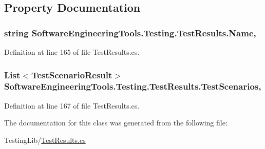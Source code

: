 \subsection{Property Documentation}
\hypertarget{class_software_engineering_tools_1_1_testing_1_1_test_results_af99977749c177523bcc298652bdde8c2}{
\subsubsection[{Name}]{\setlength{\rightskip}{0pt plus 5cm}string Software\+Engineering\+Tools.\+Testing.\+Test\+Results.\+Name\hspace{0.3cm}{\ttfamily [get]}, {\ttfamily [set]}}}\label{class_software_engineering_tools_1_1_testing_1_1_test_results_af99977749c177523bcc298652bdde8c2}


Definition at line 165 of file Test\+Results.\+cs.

\hypertarget{class_software_engineering_tools_1_1_testing_1_1_test_results_ac90e7e412834351717bad9a9ccb39366}{
\subsubsection[{Test\+Scenarios}]{\setlength{\rightskip}{0pt plus 5cm}List$<${\bf Test\+Scenario\+Result}$>$ Software\+Engineering\+Tools.\+Testing.\+Test\+Results.\+Test\+Scenarios\hspace{0.3cm}{\ttfamily [get]}, {\ttfamily [set]}}}\label{class_software_engineering_tools_1_1_testing_1_1_test_results_ac90e7e412834351717bad9a9ccb39366}


Definition at line 167 of file Test\+Results.\+cs.



The documentation for this class was generated from the following file\+:\begin{DoxyCompactItemize}
\item 
Testing\+Lib/\hyperlink{_test_results_8cs}{Test\+Results.\+cs}\end{DoxyCompactItemize}
